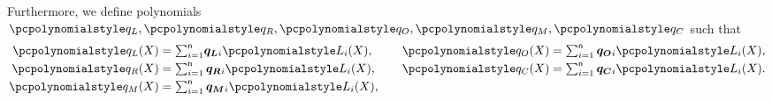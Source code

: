 Furthermore, we define polynomials $\p{q_L}, \p{q_R}, \p{q_O}, \p{q_M}, \p{q_C}$
such that
\begin{equation*}
  \begin{aligned}
  \p{q_L}(X) & = {\textstyle \sum_{i = 1}^{\noofc}} \vql_i \lag_i(X), \\
  \p{q_R}(X) & = \textstyle \sum_{i = 1}^{\noofc} \vqr_i \lag_i(X), \\
  \p{q_M}(X) & = \textstyle \sum_{i = 1}^{\noofc} \vqm_i \lag_i(X),
\end{aligned}
\qquad
\begin{aligned}
  \p{q_O}(X) & = \textstyle  \sum_{i = 1}^{\noofc} \vqo_i \lag_i(X), \\
  \p{q_C}(X) & =  \textstyle \sum_{i = 1}^{\noofc} \vqc_i \lag_i(X). \\
  \vphantom{\p{q_M}(X)  = \textstyle \sum_{i = 1}^{\noofc} \vqm_i \lag_i(X),}
\end{aligned}
\end{equation*}

